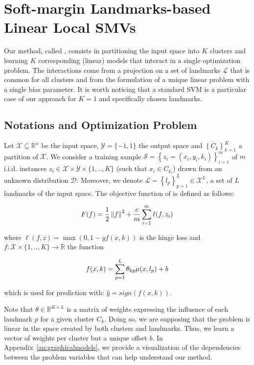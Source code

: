 \section{Soft-margin Landmarks-based Linear Local SMVs}
\label{sec:method}

Our method, called \landSVM, consists in partitioning the input space into $K$ clusters and learning $K$ corresponding (linear) models that interact in a single optimization problem.
The interactions come from a projection on a set of landmarks $\mathcal{L}$ that is common for all clusters and from the formulation of a unique linear problem with a single bias parameter.
It is worth noticing that a standard SVM is a particular case of our approach for $K=1$ and specifically chosen landmarks.

\subsection{Notations and Optimization Problem}

Let $\mathcal{X} \subseteq \mathbb{R}^n$ be the input space, $\mathcal{Y} = \{-1,1\}$ the output space and $\left\{C_k\right\}_{k=1}^K$ a partition of $\mathcal{X}$. We consider a training sample $\mathcal{S} = \left\{z_i=(x_i,y_i,k_i)\right\}_{i=1}^{m}$ of $m$ i.i.d. instances $z_i \in \mathcal{X} \times \mathcal{Y} \times \{1,..,K\}$ (such that $x_i \in C_{k_i}$) drawn from an unknown distribution $\mathcal{D}$.
Moreover, we  denote $\mathcal{L} = \left\{l_p\right\}_{p=1}^L \in \mathcal{X}^L$, a set of $L$ landmarks of the input space. 
The objective function of \landSVM is defined as follows:

$$ F(f) = \frac{1}{2} \left\| f \right\|^2 + \frac{c}{m} \sum_{i=1}^m \ell(f,z_i)$$

where $\ell(f,z) = \max(0,1-y f(x,k)) $ is the hinge loss and $f: \mathcal{X} \times \{1,..,K\} \to \mathbb{R}$ the function

$$ f(x,k) = \sum_{p=1}^L \theta_{kp} \mu(x,l_p) + b$$

which is  used for prediction with: $\hat{y} = sign(f(x,k))$.

Note that $\theta \in \mathbb{R}^{K \times L}$ is a matrix of weights expressing the influence of each landmark $p$ for a given cluster $C_k$. Doing so, we are supposing that the problem is linear in the space created by  both clusters and landmarks. Thus, we learn a vector of weights per cluster but a unique offset $b$. In Appendix~\ref{an:graphicalmodels}, we provide a visualization of the dependencies between the problem variables that can help understand our method.

